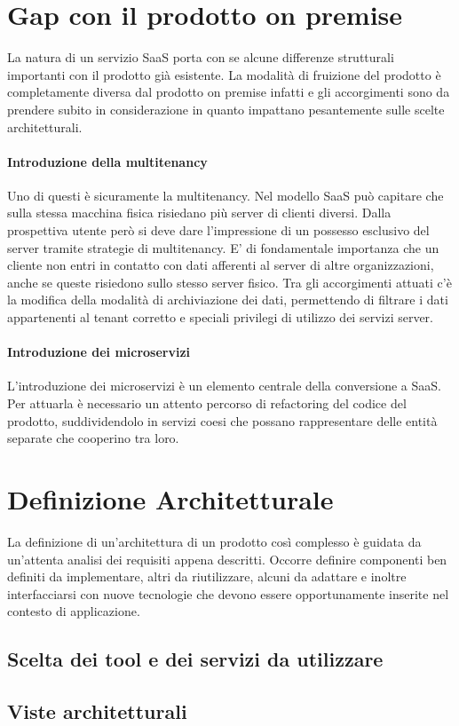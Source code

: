 \section{Gap con il prodotto on premise}
La natura di un servizio SaaS porta con se alcune differenze strutturali importanti con il prodotto già esistente. La modalità di fruizione del prodotto è completamente diversa dal prodotto on premise infatti e gli accorgimenti sono da prendere subito in considerazione in quanto impattano pesantemente sulle scelte architetturali.
\paragraph{Introduzione della multitenancy}
Uno di questi è sicuramente la multitenancy. Nel modello SaaS può capitare che sulla stessa macchina fisica risiedano più server di clienti diversi. Dalla prospettiva utente però si deve dare l'impressione di un possesso esclusivo del server tramite strategie di multitenancy. E' di fondamentale importanza che un cliente non entri in contatto con dati afferenti al server di altre organizzazioni, anche se queste risiedono sullo stesso server fisico. Tra gli accorgimenti attuati c'è la modifica della modalità di archiviazione dei dati, permettendo di filtrare i dati appartenenti al tenant corretto e speciali privilegi di utilizzo dei servizi server. 
\paragraph{Introduzione dei microservizi}
L'introduzione dei microservizi è un elemento centrale della conversione a SaaS. Per attuarla è necessario un attento percorso di refactoring del codice del prodotto, suddividendolo in servizi coesi che possano rappresentare delle entità separate che cooperino tra loro.

\section{Definizione Architetturale}
La definizione di un'architettura di un prodotto così complesso è guidata da un'attenta analisi dei requisiti appena descritti. Occorre definire componenti ben definiti da implementare, altri da riutilizzare, alcuni da adattare e inoltre interfacciarsi con nuove tecnologie che devono essere opportunamente inserite nel contesto di applicazione.
\subsection{Scelta dei tool e dei servizi da utilizzare}
\subsection{Viste architetturali}
